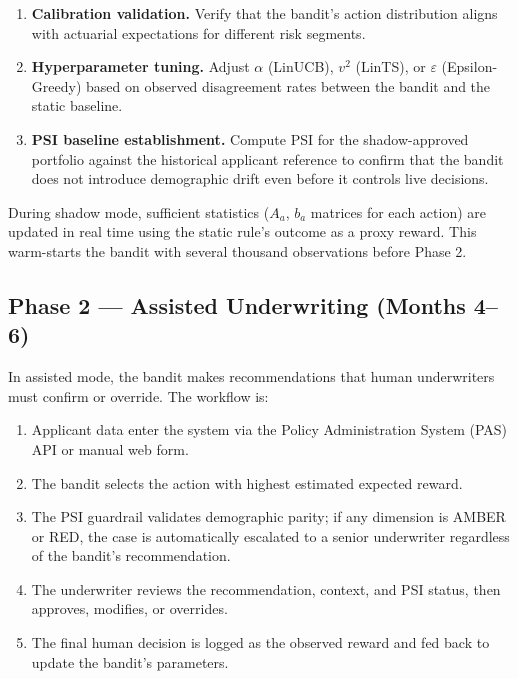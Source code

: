 \begin{enumerate}
\def\labelenumi{\arabic{enumi}.}
\tightlist
\item
  \textbf{Calibration validation.} Verify that the bandit's action distribution aligns with actuarial expectations for different risk segments.
\item
  \textbf{Hyperparameter tuning.} Adjust \(\alpha\) (LinUCB), \(v^2\) (LinTS), or \(\varepsilon\) (Epsilon-Greedy) based on observed disagreement rates between the bandit and the static baseline.
\item
  \textbf{PSI baseline establishment.} Compute PSI for the shadow-approved portfolio against the historical applicant reference to confirm that the bandit does not introduce demographic drift even before it controls live decisions.
\end{enumerate}

During shadow mode, sufficient statistics (\(A_a\), \(b_a\) matrices for each action) are updated in real time using the static rule's outcome as a proxy reward. This warm-starts the bandit with several thousand observations before Phase 2.

\subsection{Phase 2 --- Assisted Underwriting (Months 4--6)}\label{phase-2-assisted-underwriting-months-46}

In assisted mode, the bandit makes recommendations that human underwriters must confirm or override. The workflow is:

\begin{enumerate}
\def\labelenumi{\arabic{enumi}.}
\tightlist
\item
  Applicant data enter the system via the Policy Administration System (PAS) API or manual web form.
\item
  The bandit selects the action with highest estimated expected reward.
\item
  The PSI guardrail validates demographic parity; if any dimension is AMBER or RED, the case is automatically escalated to a senior underwriter regardless of the bandit's recommendation.
\item
  The underwriter reviews the recommendation, context, and PSI status, then approves, modifies, or overrides.
\item
  The final human decision is logged as the observed reward and fed back to update the bandit's parameters.
\end{enumerate}

